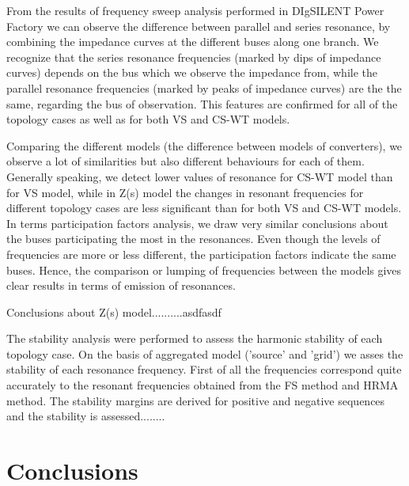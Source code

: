 \documentclass[12pt]{report} %
\begin{document}
From the results of frequency sweep analysis performed in DIgSILENT Power Factory we can observe the difference between parallel and series resonance, by combining the impedance curves at the different buses along one branch. We recognize that the series resonance frequencies (marked by dips of impedance curves) depends on the bus which we observe the impedance from, while the parallel resonance frequencies (marked by peaks of impedance curves) are the the same, regarding the bus of observation. This features are confirmed for all of the topology cases as well as for both VS and CS-WT models.

Comparing the different models (the difference between models of converters), we observe a lot of similarities but also different behaviours for each of them. Generally speaking, we detect lower values of resonance for CS-WT model than for VS model, while in Z(s) model the changes in resonant frequencies for different topology cases are less significant than for both VS and CS-WT models. In terms participation factors analysis, we draw very similar conclusions about the buses participating the most in the resonances. Even though the levels of frequencies are more or less different, the participation factors indicate the same buses. Hence, the comparison or lumping of frequencies between the models gives clear results in terms of emission of resonances.

Conclusions about Z(s) model..........asdfasdf

The stability analysis were performed to assess the harmonic stability of each topology case. On the basis of aggregated model ('source' and 'grid') we asses the stability of each resonance frequency. First of all the frequencies correspond quite accurately to the resonant frequencies obtained from the FS method and HRMA method. The stability margins are derived for positive and negative sequences and the stability is assessed........

\section{Conclusions}




\end{document}
